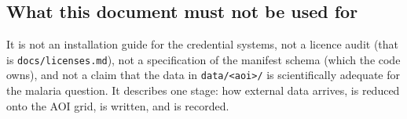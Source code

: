 \documentclass[11pt,a4paper]{article}
\newcommand{\code}[1]{\texttt{#1}}
\begin{document}
\subsection{What this document must not be used for}

It is not an installation guide for the credential systems, not a licence
audit (that is \code{docs/licenses.md}), not a specification of the manifest
schema (which the code owns), and not a claim that the data in
\code{data/<aoi>/} is scientifically adequate for the malaria question. It
describes one stage: how external data arrives, is reduced onto the AOI grid,
is written, and is recorded.
\end{document}
